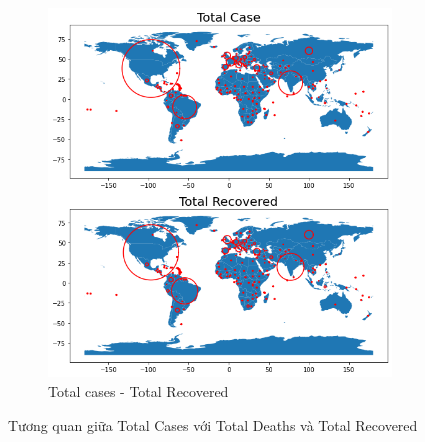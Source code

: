 \documentclass[a4paper, 12pt]{article}
\begin{document}
\begin{itemize}
\begin{itemize}
\begin{figure}[H]
\begin{subfigure}{.5\textwidth}
                \end{subfigure}
                \begin{subfigure}{.5\textwidth}
                    \centering
                    \includegraphics[width=1\linewidth]{img/case_recovered.png}  
                    \caption{Total cases - Total Recovered}
    
                \end{subfigure}
                \caption{Tương quan giữa Total Cases với Total Deaths và Total Recovered}
            \end{figure}


\end{itemize}
\end{itemize}
\end{document}
